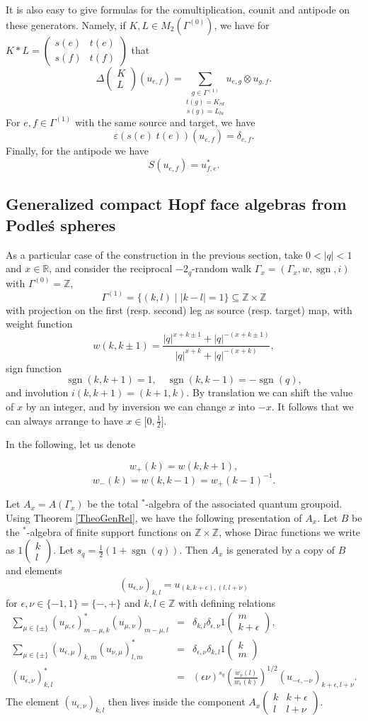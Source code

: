\documentclass[12pt]{article}
\theoremstyle{change}
\DeclareMathOperator{\sgn}{\mathrm{sgn}}
\newcommand{\R}{\mathbb{R}}
\newcommand{\Z}{\mathbb{Z}}
\newcommand{\Grru}[2]{\begin{pmatrix} #1 \\ #2\end{pmatrix}}
\newcommand{\Grr}[4]{\begin{pmatrix}#1 & #2\\#3&#4\end{pmatrix}}
\theoremstyle{definition}
\numberwithin{equation}{section}
\begin{document}
It is also easy to give formulas for the comultiplication, counit and antipode on these generators. Namely, if $K,L  \in M_2(\Gamma^{(0)})$, we have for $K*L = \begin{pmatrix} s(e) & t(e)\\ s(f)& t(f)\end{pmatrix}$ that \[\Delta\Grru{K}{L}(u_{e,f}) = \underset{s(g) = L_{lu}}{\underset{t(g) = K_{rd}}{\sum_{g\in\Gamma^{(1)}}}} u_{e,g}\otimes u_{g,f}.\] For $e,f\in \Gamma^{(1)}$ with the same source and target, we have
\[\varepsilon(s(e)\;t(e))(u_{e,f}) = \delta_{e,f}.\]
Finally, for the antipode we have \[S(u_{e,f}) = u_{f,e}^*.\]

\subsection{Generalized compact Hopf face algebras from Podle\'{s} spheres}

As a particular case of the construction in the previous section, take $0<|q|<1$ and $x\in \R$, and consider the reciprocal $-2_q$-random walk $\Gamma_x =(\Gamma_x,w,\sgn,i)$ with $\Gamma^{(0)} = \Z$, \[\Gamma^{(1)} = \{(k,l)\mid |k-l|= 1\}\subseteq \Z\times \Z\] with projection on the first (resp. second) leg as source (resp. target) map, with weight function \[w(k,k\pm 1) = \frac{|q|^{x+k\pm 1}+|q|^{-(x+k\pm 1)}}{|q|^{x+k}+|q|^{-(x+k)}},\] sign function \[\sgn(k,k+1) = 1,\quad \sgn(k,k-1) = -\sgn(q),\] and involution $i(k,k+1) = (k+1,k)$. By translation we can shift the value of $x$ by an integer, and by inversion we can change $x$ into $-x$. It follows that we can always arrange to have $x\in \lbrack 0,\frac{1}{2}\rbrack$.

In the following, let us denote

\[w_+(k) = w(k,k+1),\]\[w_-(k)  = w(k,k-1) = w_+(k-1)^{-1}.\] 

Let $A_x = A(\Gamma_x)$ be the total $^*$-algebra of the associated quantum groupoid. Using Theorem \ref{TheoGenRel}, we have the following presentation of $A_x$. Let $B$ be the $^*$-algebra of finite support functions on $\Z\times \Z$, whose Dirac functions we write as $1\Grru{k}{l}$. Let $s_q = \frac{1}{2}(1+\sgn(q))$. Then $A_x$ is generated by a copy of $B$ and elements \[(u_{\epsilon,\nu})_{k,l} = u_{(k,k+\epsilon),(l,l+\nu)}\] for $\epsilon,\nu\in \{-1,1\}=\{-,+\}$ and $k,l\in \Z$ with defining relations \begin{eqnarray*} \sum_{\mu\in \{\pm\}} (u_{\mu,\epsilon})_{m-\mu,k}^* (u_{\mu,\nu})_{m-\mu,l}&=& \delta_{k,l} \delta_{\epsilon,\nu} 1\Grru{m}{k+\epsilon},\\ \sum_{\mu\in \{\pm\}} (u_{\epsilon,\mu})_{k,m} (u_{\nu,\mu})_{l,m}^* &=& \delta_{\epsilon,\nu}\delta_{k,l} 1\Grru{k}{m}\\ (u_{\epsilon,\nu})_{k,l}^* &=& (\epsilon\nu)^{s_q} \left(\frac{w_{\nu}(l)}{w_{\epsilon}(k)}\right)^{1/2} (u_{-\epsilon,-\nu})_{k+\epsilon,l+\nu}.\end{eqnarray*} The element $(u_{\epsilon,\nu})_{k,l}$ then lives inside the component $A_x\Grr{k}{k+\epsilon}{l}{l+\nu}$.
\end{document}
